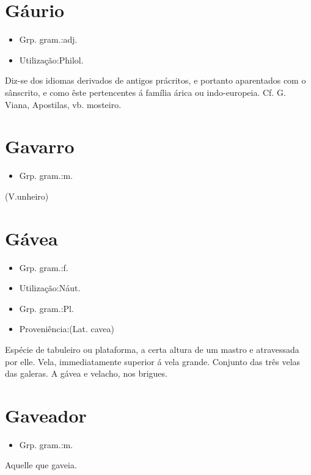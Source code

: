 \section{Gáurio}
\begin{itemize}
\item {Grp. gram.:adj.}
\end{itemize}
\begin{itemize}
\item {Utilização:Philol.}
\end{itemize}
Diz-se dos idiomas derivados de antigos prácritos, e portanto aparentados com o sânscrito, e como êste pertencentes á família árica ou indo-europeia. Cf. G. Viana, \textunderscore Apostilas\textunderscore , vb. \textunderscore mosteiro\textunderscore .
\section{Gavarro}
\begin{itemize}
\item {Grp. gram.:m.}
\end{itemize}
(V.unheiro)
\section{Gávea}
\begin{itemize}
\item {Grp. gram.:f.}
\end{itemize}
\begin{itemize}
\item {Utilização:Náut.}
\end{itemize}
\begin{itemize}
\item {Grp. gram.:Pl.}
\end{itemize}
\begin{itemize}
\item {Proveniência:(Lat. \textunderscore cavea\textunderscore )}
\end{itemize}
Espécie de tabuleiro ou plataforma, a certa altura de um mastro e atravessada por elle.
Vela, immediatamente superior á vela grande.
Conjunto das três velas das galeras.
A gávea e velacho, nos brigues.
\section{Gaveador}
\begin{itemize}
\item {Grp. gram.:m.}
\end{itemize}
Aquelle que gaveia.

